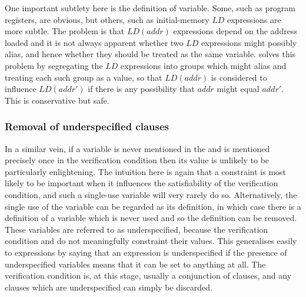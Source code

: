 One important subtlety here is the definition of variable.  Some, such
as program registers, are obvious, but others, such as initial-memory
$LD$ expressions are more subtle.  The problem is that $LD(addr)$
expressions depend on the address loaded and it is not always apparent
whether two $LD$ expressions might possibly alias, and hence whether
they should be treated as the same variable.  {\Technique} solves this
problem by segregating the $LD$ expressions into groups which might
alias and treating each such group as a value, so that $LD(addr)$ is
considered to influence $LD(addr')$ if there is any possibility that
$addr$ might equal $addr'$.  This is conservative but safe.




\subsubsection{Removal of underspecified clauses}


In a similar vein, if a variable is never mentioned in the
{\StateMachines} and is mentioned precisely once in the verification
condition then its value is unlikely to be particularly enlightening.
The intuition here is again that a constraint is most likely to be
important when it influences the satisfiability of the verification
condition, and such a single-use variable will very rarely do so.
Alternatively, the single use of the variable can be regarded as its
definition, in which case there is a definition of a variable which is
never used and so the definition can be removed.  These variables are
referred to as underspecified, because the verification condition and
{\StateMachines} do not meaningfully constraint their values.  This
generalises easily to expressions by saying that an expression is
underspecified if the presence of underspecified variables means that
it can be set to anything at all.  The verification condition is, at
this stage, usually a conjunction of clauses, and any clauses which
are underspecified can simply be discarded.


